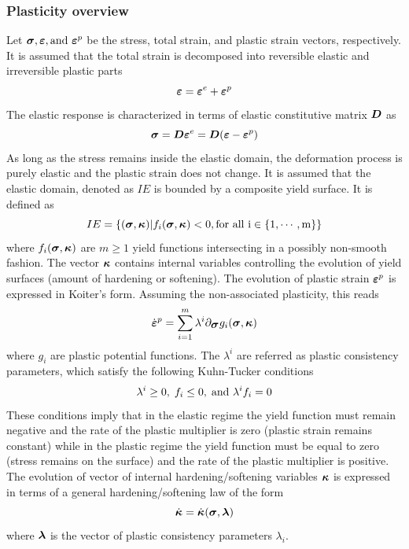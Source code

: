 \documentclass[a4paper]{article}
\newcommand{\mbf}[1]{\mbox{\boldmath$#1$}}
\newcommand{\ep}[0]{\mbf{\varepsilon}^p}
\newcommand{\epd}[0]{\dot{\mbf{\varepsilon}}^p}
\newcommand{\e}{\mbf{\varepsilon}}
\newcommand{\sig}{\mbf{\sigma}}
\begin{document}
\subsubsection{Plasticity overview}
Let $\mbf{\sigma},\e, {\rm and}\  \ep$ be the stress, total strain, and plastic strain vectors, respectively.
It is assumed that the total strain is decomposed into reversible elastic and irreversible plastic parts
\begin{equation}
  \e = \e^e + \ep
\end{equation}
The elastic response is characterized in terms of elastic constitutive matrix $\mbf{D}$ as
\begin{equation}
\label{el1}
\mbf{\sigma}=\mbf{D}\e^e = \mbf{D}(\mbf{\varepsilon}-\ep)
\end{equation}
As long as the stress remains inside the elastic domain, the deformation process is purely elastic and the plastic strain does not change.
It is assumed that the elastic domain, denoted as $IE$ is bounded by a composite yield surface. It is defined as
\begin{equation}
IE=\{(\mbf{\sigma},\mbf{\kappa})|f_i(\mbf{\sigma},\mbf{\kappa})<0, \rm{for\ all\ }i\in\{1,\cdots,m\}\}
\end{equation}
where $f_i(\mbf{\sigma},\mbf{\kappa})$ are $m\ge1$ yield functions intersecting in a possibly non-smooth fashion. The
vector $\mbf{\kappa}$ contains internal variables controlling the evolution of yield surfaces (amount of hardening or softening).
The evolution of plastic strain $\ep$ is expressed in Koiter's form. Assuming the non-associated plasticity, this reads
\begin{equation}
\label{epe}
\epd=\sum^{m}_{i=1} \lambda^i \partial_{\mbf{\sigma}}g_i(\mbf{\sigma},\mbf{\kappa})
\end{equation}
where $g_i$ are plastic potential functions. The $\lambda^i$ are referred as plastic consistency parameters, which satisfy the following Kuhn-Tucker conditions
\begin{equation}
\label{ktc}
\lambda^i\ge0,\;f_i\le0,\;{\rm and}\ \lambda^i f_i=0
\end{equation}
These conditions imply  that in the elastic regime the yield function must remain negative and the rate of the plastic multiplier is zero (plastic strain remains constant) while in the plastic regime the yield function must be equal to zero (stress remains on the surface) and the rate of the plastic multiplier is positive.
The evolution of vector of internal hardening/softening variables $\mbf{\kappa}$  is expressed in terms of a general
hardening/softening law of the form
\begin{equation}
\dot{\mbf{\kappa}} = \dot{\mbf{\kappa}}(\sig, \mbf{\lambda})
\end{equation}
where $\mbf{\lambda}$ is the vector of plastic consistency parameters $\lambda_i$.
\end{document}
